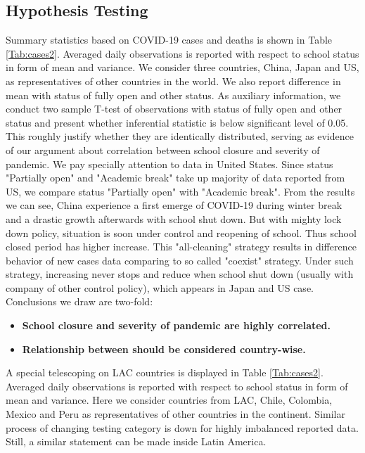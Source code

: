 \documentclass{article}
\begin{document}
\subsection{Hypothesis Testing}
Summary statistics based on COVID-19 cases and deaths is shown in Table \ref{Tab:cases2}. Averaged daily observations is reported with respect to school status in form of mean and variance. We consider three countries, China, Japan and US, as representatives of other countries in the world. We also report difference in mean with status of fully open and other status. As auxiliary information, we conduct two sample T-test of observations with status of fully open and other status and present whether inferential statistic is below significant level of 0.05. This roughly justify whether they are identically distributed, serving as evidence of our argument about correlation between school closure and severity of pandemic. We pay specially attention to data in United States. Since status "Partially open" and "Academic break" take up majority of data reported from US, we compare status "Partially open" with "Academic break". From the results we can see, China experience a first emerge of COVID-19 during winter break and a drastic growth afterwards with school shut down. But with mighty lock down policy, situation is soon under control and reopening of school. Thus school closed period has higher increase. This "all-cleaning" strategy results in difference behavior of new cases data comparing to so called "coexist" strategy. Under such strategy, increasing never stops and reduce when school shut down (usually with company of other control policy), which appears in Japan and US case. Conclusions we draw are two-fold:

\begin{itemize}
    \item \textbf{School closure and severity of pandemic are highly correlated.}
    \item \textbf{Relationship between should be considered country-wise. }
\end{itemize}

A special telescoping on LAC countries is displayed in Table \ref{Tab:cases2}. Averaged daily observations is reported with respect to school status in form of mean and variance. Here we consider countries from LAC, Chile, Colombia, Mexico and Peru as representatives of other countries in the continent. Similar process of changing testing category is down for highly imbalanced reported data. Still, a similar statement can be made inside Latin America. 
\end{document}
